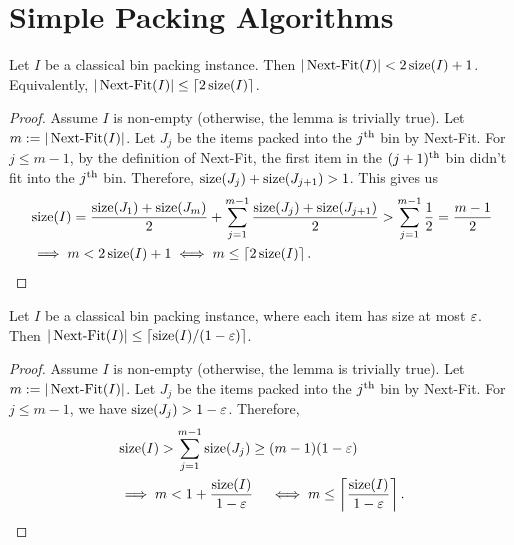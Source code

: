 \section{Simple Packing Algorithms}
\label{sec:preliminaries:simple-algos}

\begin{lemma}
\label{thm:next-fit}
Let $I$ be a classical bin packing instance. Then
$|\operatorname{Next-Fit}(I)| < 2\operatorname{size}(I) + 1$.
Equivalently, $|\operatorname{Next-Fit}(I)| \le \left\lceil 2\operatorname{size}(I) \right\rceil$.
\end{lemma}
\begin{proof}
Assume $I$ is non-empty (otherwise, the lemma is trivially true).
Let $m := |\operatorname{Next-Fit}(I)|$.
Let $J_j$ be the items packed into the $j^{\textrm{th}}$ bin by Next-Fit.
For $j \le m-1$, by the definition of Next-Fit,
the first item in the $(j+1)^{\textrm{th}}$ bin didn't fit into the $j^{\textrm{th}}$ bin.
Therefore, $\operatorname{size}(J_j) + \operatorname{size}(J_{j+1}) > 1$. This gives us
\begin{align*}
& \operatorname{size}(I)
= \frac{\operatorname{size}(J_1) + \operatorname{size}(J_m)}{2} + \sum_{j=1}^{m-1} \frac{\operatorname{size}(J_j) + \operatorname{size}(J_{j+1})}{2}
> \sum_{j=1}^{m-1} \frac{1}{2} = \frac{m-1}{2}
\\ &\implies m < 2\operatorname{size}(I) + 1 \iff m \le \left\lceil 2\operatorname{size}(I) \right\rceil.  \qedhere
\end{align*}
\end{proof}

\begin{lemma}
\label{thm:next-fit-small}
Let $I$ be a classical bin packing instance, where each item has size at most $\varepsilon$. Then
$|\operatorname{Next-Fit}(I)| \le \left\lceil \operatorname{size}(I)/(1-\varepsilon) \right\rceil$.
\end{lemma}
\begin{proof}
Assume $I$ is non-empty (otherwise, the lemma is trivially true).
Let $m := |\operatorname{Next-Fit}(I)|$.
Let $J_j$ be the items packed into the $j^{\textrm{th}}$ bin by Next-Fit.
For $j \le m-1$, we have $\operatorname{size}(J_j) > 1-\varepsilon$.
Therefore,
\begin{align*}
& \operatorname{size}(I) > \sum_{j=1}^{m-1} \operatorname{size}(J_j) \ge (m-1)(1-\varepsilon)
\\ &\implies m < 1 + \frac{\operatorname{size}(I)}{1-\varepsilon}
\quad\iff m \le \left\lceil \frac{\operatorname{size}(I)}{1-\varepsilon} \right\rceil.
\qedhere \end{align*}
\end{proof}

